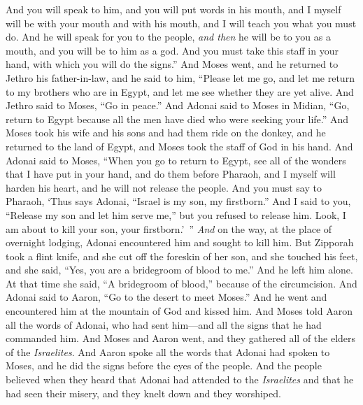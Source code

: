 \begin{biblechapter}
\verse And you will speak to him, and you will put words in his mouth, and I myself will be with your mouth and with his mouth, and I will teach you what you must do.
\verse And he will speak for you to the people, \textit{and then} he will be to you as a mouth, and you will be to him as a god.
\verse And you must take this staff in your hand, with which you will do the signs.”
 And Moses went, and he returned to Jethro his father-in-law, and he said to him, “Please let me go, and let me return to my brothers who are in Egypt, and let me see whether they are yet alive. And Jethro said to Moses, “Go in peace.”
\verse And Adonai said to Moses in Midian, “Go, return to Egypt because all the men have died who were seeking your life.”
\verse And Moses took his wife and his sons and had them ride on the donkey, and he returned to the land of Egypt, and Moses took the staff of God in his hand.
\verse And Adonai said to Moses, “When you go to return to Egypt, see all of the wonders that I have put in your hand, and do them before Pharaoh, and I myself will harden his heart, and he will not release the people.
\verse And you must say to Pharaoh, ‘Thus says Adonai, “Israel is my son, my firstborn.”
\verse And I said to you, “Release my son and let him serve me,” but you refused to release him. Look, I am about to kill your son, your firstborn.’ ”
\verse \textit{And} on the way, at the place of overnight lodging, Adonai encountered him and sought to kill him.
\verse But Zipporah took a flint knife, and she cut off the foreskin of her son, and she touched his feet, and she said, “Yes, you are a bridegroom of blood to me.”
\verse And he left him alone. At that time she said, “A bridegroom of blood,” because of the circumcision.
\verse And Adonai said to Aaron, “Go to the desert to meet Moses.” And he went and encountered him at the mountain of God and kissed him.
\verse And Moses told Aaron all the words of Adonai, who had sent him—and all the signs that he had commanded him.
\verse And Moses and Aaron went, and they gathered all of the elders of the \textit{Israelites}.
\verse And Aaron spoke all the words that Adonai had spoken to Moses, and he did the signs before the eyes of the people.
\verse And the people believed when they heard that Adonai had attended to the \textit{Israelites} and that he had seen their misery, and they knelt down and they worshiped.
\end{biblechapter}


